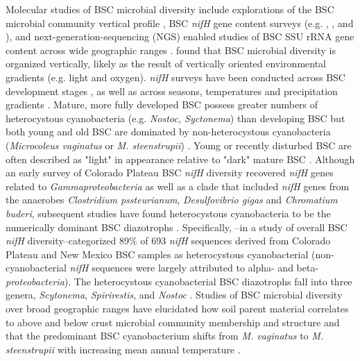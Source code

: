 Molecular studies of BSC microbial diversity include explorations of the BSC
microbial community vertical profile \citep{Garcia_Pichel_2003}, BSC
\textit{nifH} gene content surveys (e.g. \citet{14766579}, \citet{Yeager_2012},
\citet{Yeager} and \citet{Steppe_1996}), and next-generation-sequencing (NGS)
enabled studies of BSC SSU rRNA gene content across wide geographic ranges
\citep{Garcia_Pichel_2013, Steven_2013}. \citet{Garcia_Pichel_2003} found that
BSC microbial diversity is organized vertically, likely as the result of
vertically oriented environmental gradients (e.g. light and oxygen).
\textit{nifH} surveys have been conducted across BSC development stages
\citep{14766579}, as well as across seasons, temperatures and precipitation
gradients \citep{Yeager_2012}. Mature, more fully developed BSC possess greater
numbers of heterocystous cyanobacteria (e.g. \textit{Nostoc, Syctonema}) than
developing BSC but both young and old BSC are dominated by non-heterocystous
cyanobacteria (\textit{Microcoleus vaginatus} or \textit{M. steenstrupii})
\citep{14766579, Garcia_Pichel_2013}. Young or recently disturbed BSC are often
described as "light" in appearance relative to "dark" mature BSC
\citep{Belnap_2002, 14766579}.  Although an early survey of Colorado Plateau BSC
\textit{nifH} diversity recovered \textit{nifH} genes related to
\textit{Gammaproteobacteria} as well as a clade that included \textit{nifH}
genes from the anaerobes \textit{Clostridium pssteurianum},
\textit{Desulfovibrio gigas} and \textit{Chromatium buderi}, subsequent studies
have found heterocystous cyanobacteria to be the numerically dominant BSC
diazotrophs \citep{Yeager, 14766579, Yeager_2012}. Specifically,
\citet{Yeager}--in a study of overall BSC \textit{nifH} diversity--categorized
89\% of 693 \textit{nifH} sequences derived from Colorado Plateau and New
Mexico BSC samples as heterocystous cyanobacterial (non-cyanobacterial
\textit{nifH} sequences were largely attributed to alpha- and beta-
\textit{proteobacteria}). The heterocystous cyanobacterial BSC diazotrophs fall
into three genera, \textit{Scytonema}, \textit{Spirirestis}, and
\textit{Nostoc} \citep{Yeager, Yeager_2012}. Studies of BSC microbial diversity
over broad geographic ranges have elucidated how soil parent material
correlates to above and below crust microbial community membership and
structure \citep{Steven_2013} and that the predominant BSC cyanobacterium shifts
from \textit{M. vaginatus} to \textit{M. steenstrupii} with increasing mean
annual temperature \citep{Garcia_Pichel_2013}.

